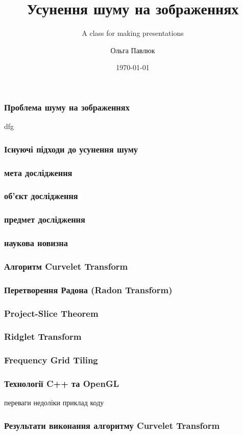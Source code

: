 \documentclass[12pt]{beamer}
\title{Усунення шуму на зображеннях}
\author{Ольга Павлюк}
\subtitle{{ A class for making presentations}}
\institute{Національний університет "Львівська політехніка", кафедра ПЗ}
\date{\today}
\begin{document}
\begin{frame}
	\titlepage
\end{frame}

\begin{frame}\frametitle{Проблема шуму на зображеннях}
	dfg
\end{frame}

\begin{frame}\frametitle{Існуючі підходи до усунення шуму}
\end{frame}

\begin{frame}\frametitle{мета дослідження}
\end{frame}

\begin{frame}\frametitle{об’єкт дослідження}
\end{frame}

\begin{frame}\frametitle{предмет дослідження}
\end{frame}

\begin{frame}\frametitle{наукова новизна}
\end{frame}

\begin{frame}\frametitle{Алгоритм Curvelet Transform }
\end{frame}

\begin{frame}\frametitle{Перетворення Радона (Radon Transform) }
\end{frame}

\begin{frame}\frametitle{Project-Slice Theorem }
\end{frame}

\begin{frame}\frametitle{Ridglet Transform }
\end{frame}

\begin{frame}\frametitle{Frequency Grid Tiling }
\end{frame}

\begin{frame}\frametitle{Технології C++ та OpenGL}
	переваги
	недоліки
	приклад коду
\end{frame}

\begin{frame}\frametitle{Результати виконання алгоритму Curvelet Transform}
\end{frame}
\end{document}
